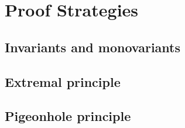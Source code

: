 
\section{Proof Strategies}

\subsection{Invariants and monovariants}


\subsection{Extremal principle}


\subsection{Pigeonhole principle}

